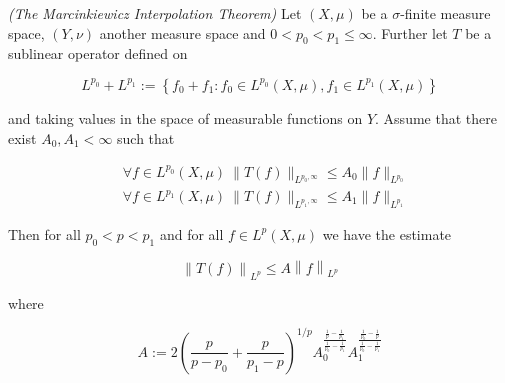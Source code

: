 \begin{mdframed}
	\begin{theorem}\emph{(The Marcinkiewicz Interpolation Theorem)}
		Let $(X,\mu)$ be a $\sigma$-finite measure space, $(Y,\nu)$ another measure space and $0 < p_0 < p_1 \leqslant \infty$. Further let $T$ be a sublinear operator defined on
		
		\begin{equation*}
			L^{p_0} + L^{p_1} := \left\{ f_0 + f_1 : f_0 \in L^{p_0}(X,\mu), f_1 \in L^{p_1}(X,\mu) \right\}
		\end{equation*}
		
		and taking values in the space of measurable functions on $Y$. Assume that there exist $A_0,A_1 < \infty$ such that

		\begin{align}
			&\forall f \in L^{p_0}(X,\mu)~\|T(f)\|_{L^{p_0,\infty}} \leqslant A_0 \|f\|_{L^{p_0}}\label{hyp:fp_0}\\
			&\forall f \in L^{p_1}(X,\mu)~\|T(f)\|_{L^{p_1,\infty}} \leqslant A_1 \|f\|_{L^{p_1}}\label{hyp:fp_1}
		\end{align}

		Then for all $p_0 < p < p_1$ and for all $f \in L^p(X,\mu)$ we have the estimate

		\begin{equation}
			\left\|T(f)\right\|_{L^p} \leqslant A \left\|f\right\|_{L^p}
		\end{equation}

		where

		\begin{equation}
			A := 2\left( \frac{p}{p - p_0} + \frac{p}{p_1 - p} \right)^{1/p}A_0^{\frac{\frac{1}{p} - \frac{1}{p_1}}{\frac{1}{p_0}-\frac{1}{p_1}}}A_1^{\frac{\frac{1}{p_0}-\frac{1}{p}}{\frac{1}{p_0}-\frac{1}{p_1}}}
			\label{eq:constant}
		\end{equation}
	\end{theorem}
\end{mdframed}


